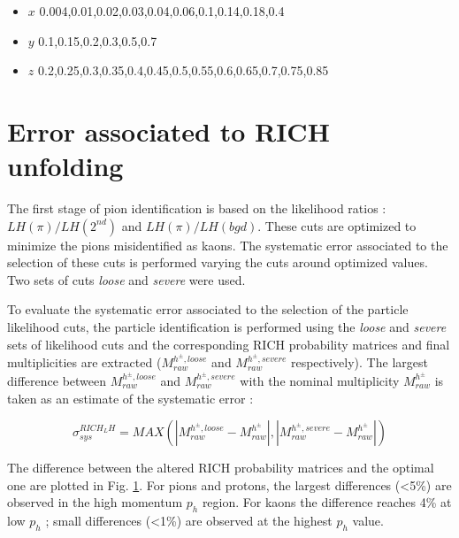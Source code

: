 \begin{itemize}
  \item $x$ {0.004,0.01,0.02,0.03,0.04,0.06,0.1,0.14,0.18,0.4}
  \item $y$ {0.1,0.15,0.2,0.3,0.5,0.7}
  \item $z$ {0.2,0.25,0.3,0.35,0.4,0.45,0.5,0.55,0.6,0.65,0.7,0.75,0.85}
\end{itemize}


\section{Error associated to RICH unfolding}

The first stage of pion identification is based on the likelihood ratios : $LH(\pi)/LH(2^{nd})$ and $LH(\pi)/LH(bgd)$. These cuts are optimized to minimize the
pions misidentified as kaons. The systematic error associated to the selection of these cuts is performed varying the cuts around optimized values. Two sets of
cuts \textit{loose} and \textit{severe} were used.

\begin{table}
  \caption{}
  \label{}

\end{table}

To evaluate the systematic error associated to the selection of the particle likelihood cuts, the particle identification is performed using the \textit{loose}
and \textit{severe} sets of likelihood cuts and the corresponding RICH probability matrices and final multiplicities are extracted ($M^{h^{\pm},loose}_{raw}$
and $M^{h^{\pm},severe}_{raw}$ respectively). The largest difference between $M^{h^{\pm},loose}_{raw}$ and $M^{h^{\pm},severe}_{raw}$ with the nominal
multiplicity $M^{h^{\pm}}_{raw}$ is taken as an estimate of the systematic error :

\begin{equation}
  \sigma^{RICH_LH}_{sys} = MAX(|M^{h^{\pm},loose}_{raw}-M^{h^{\pm}}_{raw}|,|M^{h^{\pm},severe}_{raw}-M^{h^{\pm}}_{raw}|)
\end{equation}

The difference between the altered RICH probability matrices and the optimal one are plotted in Fig. \ref{}. For pions and protons, the largest differences
(<5\%) are observed in the high momentum $p_h$ region. For kaons the difference reaches 4\% at low $p_h$ ; small differences (<1\%) are observed at the
highest $p_h$ value.

